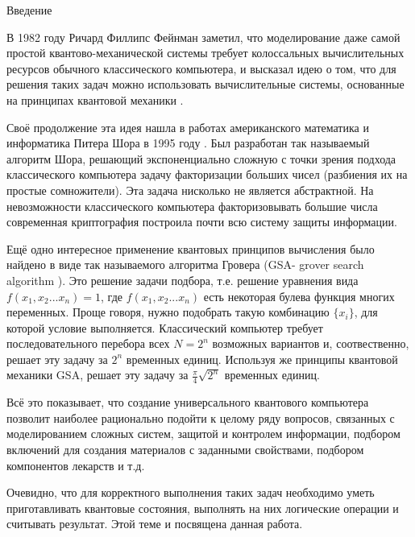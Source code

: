 \begin{center}
	\large{Введение}
\end{center}

В 1982 году Ричард Филлипс Фейнман заметил, что моделирование даже самой простой квантово-механической системы требует колоссальных вычислительных ресурсов обычного классического компьютера, и высказал идею о том, что для решения таких задач можно использовать вычислительные системы, основанные на принципах квантовой механики  \cite{Feynman1982}.

Своё продолжение эта идея нашла в работах американского математика и информатика Питера Шора в 1995 году \cite{Shor1995}. Был разработан так называемый алгоритм Шора, решающий экспоненциально сложную с точки зрения подхода классического компьютера задачу факторизации больших чисел (разбиения их на простые сомножители). Эта задача нисколько не является абстрактной. На невозможности классического компьютера факторизовывать большие числа современная криптография построила почти всю систему защиты информации.

Ещё одно интересное применение квантовых принципов вычисления было найдено в виде  так называемого алгоритма Гровера (GSA- grover search algorithm \cite{Grover1996}). Это решение задачи подбора, т.е. решение уравнения вида $f(x_1,x_2 ... x_n)=1$, где $f(x_1,x_2 ... x_n)$ есть некоторая булева функция многих переменных. Проще говоря, нужно подобрать такую комбинацию  $\{x_i\}$, для которой условие выполняется. Классический компьютер требует последовательного перебора всех $N=2^n$ возможных вариантов и, соотвественно, решает эту задачу за $2^n$ временных единиц. Используя же принципы квантовой механики GSA, решает эту задачу за $\frac{\pi}{4}\sqrt{2^n}$ временных единиц. 

Всё это показывает, что создание универсального квантового компьютера позволит наиболее рационально подойти к целому ряду вопросов, связанных с моделированием сложных систем, защитой и контролем информации, подбором включений для создания материалов с заданными свойствами, подбором компонентов лекарств и т.д. 

Очевидно, что для корректного выполнения таких задач необходимо уметь приготавливать квантовые состояния, выполнять на них логические операции и считывать результат. Этой теме и посвящена данная работа. 

